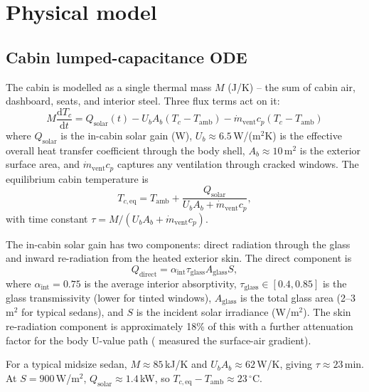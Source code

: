 \documentclass[10pt,twocolumn]{article}
\newcommand{\dd}{\mathrm{d}}
\begin{document}
\section{Physical model}

\subsection{Cabin lumped-capacitance ODE}

The cabin is modelled as a single thermal mass $M$ (J/K) -- the sum
of cabin air, dashboard, seats, and interior steel.  Three flux
terms act on it:
\begin{equation}
M \frac{\dd T_c}{\dd t}
   = Q_\text{solar}(t)
   - U_b A_b (T_c - T_\text{amb})
   - \dot{m}_\text{vent} c_p (T_c - T_\text{amb})
\label{eq:cabin}
\end{equation}
where $Q_\text{solar}$ is the in-cabin solar gain (W),
$U_b \approx 6.5$\,W/(m$^2$K) is the effective overall heat
transfer coefficient through the body shell, $A_b \approx 10$\,m$^2$
is the exterior surface area, and $\dot{m}_\text{vent} c_p$
captures any ventilation through cracked windows.  The equilibrium
cabin temperature is
\begin{equation}
T_{c,\text{eq}} = T_\text{amb} + \frac{Q_\text{solar}}{U_b A_b + \dot{m}_\text{vent} c_p},
\end{equation}
with time constant
$\tau = M / (U_b A_b + \dot{m}_\text{vent} c_p)$.

The in-cabin solar gain has two components: direct radiation
through the glass and inward re-radiation from the heated exterior
skin.  The direct component is
\begin{equation}
Q_\text{direct} = \alpha_\text{int} \tau_\text{glass} A_\text{glass} S,
\end{equation}
where $\alpha_\text{int} = 0.75$ is the average interior
absorptivity, $\tau_\text{glass} \in [0.4, 0.85]$ is the glass
transmissivity (lower for tinted windows), $A_\text{glass}$ is the
total glass area (2--3\,m$^2$ for typical sedans), and $S$ is the
incident solar irradiance (W/m$^2$).  The skin re-radiation
component is approximately 18\% of this with a further attenuation
factor for the body U-value path
(\citealp{vanos2018temperature} measured the surface-air gradient).

For a typical midsize sedan,
$M \approx 85$\,kJ/K and $U_b A_b \approx 62$\,W/K, giving
$\tau \approx 23$\,min.  At $S = 900$\,W/m$^2$,
$Q_\text{solar} \approx 1.4$\,kW, so
$T_{c,\text{eq}} - T_\text{amb} \approx 23$\,$^\circ$C.
\end{document}
